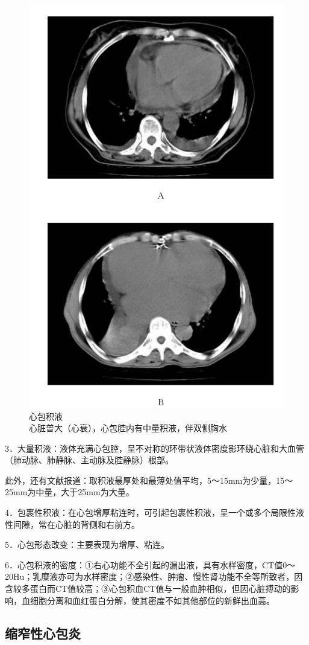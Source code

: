 \begin{figure}[!htbp]
 \centering
 \includegraphics[width=.7\textwidth,height=\textheight,keepaspectratio]{./images/Image00268.jpg}
 \captionsetup{justification=centering}
 \caption{心包积液\\{\small 心脏普大（心衰），心包腔内有中量积液，伴双侧胸水}}
 \label{fig10-8}
  \end{figure} 

3．大量积液：液体充满心包腔，呈不对称的环带状液体密度影环绕心脏和大血管（肺动脉、肺静脉、主动脉及腔静脉）根部。

此外，还有文献报道：取积液最厚处和最薄处值平均，5～15mm为少量，15～25mm为中量，大于25mm为大量。

4．包裹性积液：在心包增厚粘连时，可引起包裹性积液，呈一个或多个局限性液性间隙，常在心脏的背侧和右前方。

5．心包形态改变：主要表现为增厚、粘连。

6．心包积液的密度：①右心功能不全引起的漏出液，具有水样密度，CT值0～20Hu；乳糜液亦可为水样密度；②感染性、肿瘤、慢性肾功能不全等所致者，因含较多蛋白而CT值较高；③心包积血CT值与一般血肿相似，但因心脏搏动的影响，血细胞分离和血红蛋白分解，使其密度不如其他部位的新鲜出血高。

\subsection{缩窄性心包炎}

